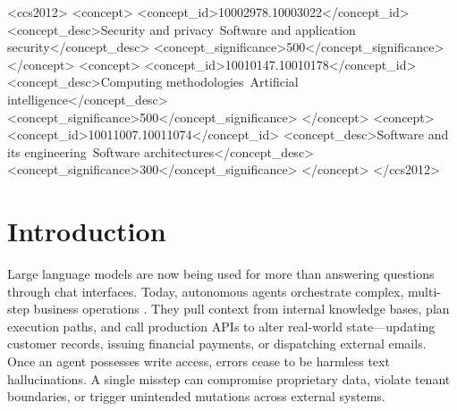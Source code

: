 \documentclass[sigconf]{acmart}
\begin{document}
\begin{CCSXML}
<ccs2012>
   <concept>
       <concept_id>10002978.10003022</concept_id>
       <concept_desc>Security and privacy~Software and application security</concept_desc>
       <concept_significance>500</concept_significance>
   </concept>
   <concept>
       <concept_id>10010147.10010178</concept_id>
       <concept_desc>Computing methodologies~Artificial intelligence</concept_desc>
       <concept_significance>500</concept_significance>
   </concept>
   <concept>
       <concept_id>10011007.10011074</concept_id>
       <concept_desc>Software and its engineering~Software architectures</concept_desc>
       <concept_significance>300</concept_significance>
   </concept>
</ccs2012>
\end{CCSXML}



\maketitle
\pagestyle{plain} %

\section{Introduction}
Large language models are now being used for more than answering questions through chat interfaces. Today, autonomous agents orchestrate complex, multi-step business operations \cite{yao2023react,wang2024agents}. They pull context from internal knowledge bases, plan execution paths, and call production APIs to alter real-world state—updating customer records, issuing financial payments, or dispatching external emails. Once an agent possesses write access, errors cease to be harmless text hallucinations. A single misstep can compromise proprietary data, violate tenant boundaries, or trigger unintended mutations across external systems.
\end{document}

